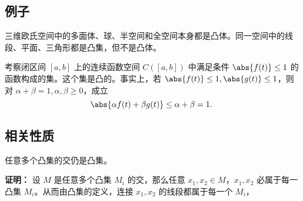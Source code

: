 \subsection{例子}
\begin{example}{}
三维欧氏空间中的多面体、球、半空间和全空间本身都是凸体。同一空间中的线段、平面、三角形都是凸集，但不是凸体。
\end{example}

\begin{example}{}
考察闭区间 $[a,b]$ 上的连续函数空间 $C([a,b])$ 中满足条件 $\abs{f(t)}\leq1$ 的函数构成的集。这个集是凸的。事实上，若 $\abs{f(t)}\leq1,\abs{g(t)}\leq1$，则对 $\alpha+\beta=1,\alpha,\beta\geq0$，成立
\begin{equation}
\abs{\alpha f(t)+\beta g(t)}\leq\alpha+\beta=1.~
\end{equation}

\end{example}




\subsection{相关性质}
\begin{theorem}{}
任意多个凸集的交仍是凸集。
\end{theorem}
\textbf{证明：} 设 $M$ 是任意多个凸集 $M_i$ 的交，那么任意 $x_1,x_2\in M$，$x_1,x_2$ 必属于每一凸集 $M_i$。从而由凸集的定义，连接 $x_1,x_2$ 的线段都属于每一个 $M_i$， 






















